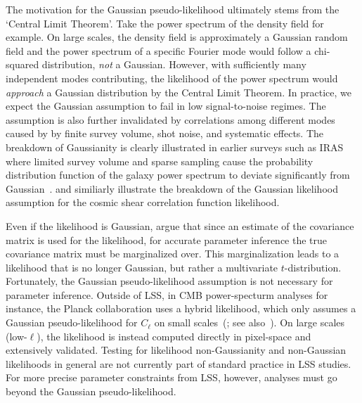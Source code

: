 \documentclass[12pt, letterpaper, preprint]{aastex}
\newcommand{\lss}{{\small{LSS}}\xspace}
\begin{document}
The motivation for the Gaussian pseudo-likelihood ultimately stems 
from the `Central Limit Theorem'. Take the power spectrum of the density 
field for example. On large scales, the density field is approximately a 
Gaussian random field and the power spectrum of a specific Fourier 
mode would follow a chi-squared distribution, \emph{not} a Gaussian. 
However, with sufficiently many independent modes contributing, the likelihood
of the power spectrum would \emph{approach} a Gaussian distribution by the Central 
Limit Theorem. In practice, we expect the Gaussian assumption 
to fail in low signal-to-noise regimes. The assumption is also further
invalidated by correlations among different modes caused by 
by finite survey volume, shot noise, and systematic effects.
The breakdown of Gaussianity is clearly illustrated in earlier 
surveys such as IRAS where limited survey volume and sparse sampling cause the 
probability distribution function of the galaxy power spectrum to deviate 
significantly from Gaussian~\citep[see Figure 9 in][]{scoccimarro2000}. 
\cite{hartlap2009} and \cite{sellentin2017} similiarly illustrate the breakdown
of the Gaussian likelihood assumption for the cosmic shear correlation function 
likelihood.

Even if the likelihood is Gaussian, \cite{sellentin2016} argue that 
since an estimate of the covariance matrix is used for the likelihood, 
for accurate parameter inference the true covariance matrix must be marginalized over. 
This marginalization leads to a likelihood that is no longer Gaussian, but rather a 
multivariate $t$-distribution. Fortunately, the Gaussian pseudo-likelihood 
assumption is not necessary for parameter inference. Outside of \lss, in CMB 
power-specturm analyses for instance, the Planck collaboration 
uses a hybrid likelihood, which only assumes a Gaussian pseudo-likelihood 
for $C_\ell$ on small scales~(\citealt{ade2014,aghanim2016}; see 
also~\citealt{efstathiou2004, efstathiou2006}). On large scales (low-$\ell$), 
the likelihood is instead computed directly in pixel-space and extensively 
validated. Testing for likelihood non-Gaussianity and non-Gaussian likelihoods 
in general are not currently part of standard practice in \lss studies. For 
more precise parameter constraints from LSS, however, analyses must go beyond the
Gaussian pseudo-likelihood.
\end{document}
